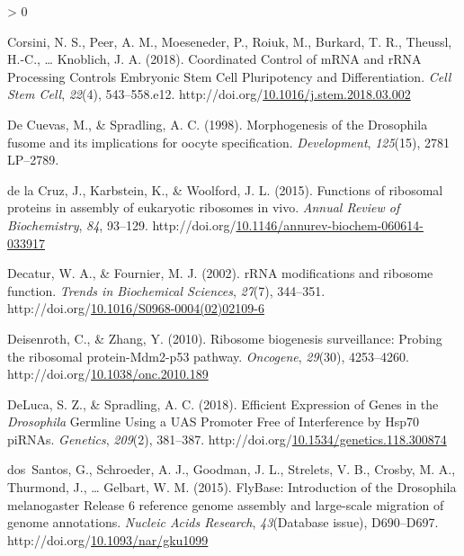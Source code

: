 \documentclass[12pt,oneside]{reedthesis}
\newlength{\cslhangindent}
\newenvironment{CSLReferences}[2] %
 {%
  \setlength{\parindent}{0pt}
  \ifodd #1 \everypar{\setlength{\hangindent}{\cslhangindent}}\ignorespaces\fi
  \ifnum #2 > 0
  \setlength{\parskip}{#2\baselineskip}
  \fi
 }%
 {}
\begin{document}
\begin{CSLReferences}{1}{0}
\leavevmode\hypertarget{ref-corsiniCoordinatedControlMRNA2018}{}%
Corsini, N. S., Peer, A. M., Moeseneder, P., Roiuk, M., Burkard, T. R., Theussl, H.-C., \ldots{} Knoblich, J. A. (2018). Coordinated {Control} of {mRNA} and {rRNA Processing Controls Embryonic Stem Cell Pluripotency} and {Differentiation}. \emph{Cell Stem Cell}, \emph{22}(4), 543--558.e12. http://doi.org/\href{https://doi.org/10.1016/j.stem.2018.03.002}{10.1016/j.stem.2018.03.002}

\leavevmode\hypertarget{ref-DeCuevas1998f}{}%
De Cuevas, M., \& Spradling, A. C. (1998). Morphogenesis of the {Drosophila} fusome and its implications for oocyte specification. \emph{Development}, \emph{125}(15), 2781 LP--2789.

\leavevmode\hypertarget{ref-delacruzFunctionsRibosomalProteins2015}{}%
de la Cruz, J., Karbstein, K., \& Woolford, J. L. (2015). Functions of ribosomal proteins in assembly of eukaryotic ribosomes in vivo. \emph{Annual Review of Biochemistry}, \emph{84}, 93--129. http://doi.org/\href{https://doi.org/10.1146/annurev-biochem-060614-033917}{10.1146/annurev-biochem-060614-033917}

\leavevmode\hypertarget{ref-Decatur2002b}{}%
Decatur, W. A., \& Fournier, M. J. (2002). {rRNA} modifications and ribosome function. \emph{Trends in Biochemical Sciences}, \emph{27}(7), 344--351. http://doi.org/\href{https://doi.org/10.1016/S0968-0004(02)02109-6}{10.1016/S0968-0004(02)02109-6}

\leavevmode\hypertarget{ref-Deisenroth2010e}{}%
Deisenroth, C., \& Zhang, Y. (2010). Ribosome biogenesis surveillance: {Probing} the ribosomal protein-{Mdm2-p53} pathway. \emph{Oncogene}, \emph{29}(30), 4253--4260. http://doi.org/\href{https://doi.org/10.1038/onc.2010.189}{10.1038/onc.2010.189}

\leavevmode\hypertarget{ref-delucaEfficientExpressionGenes2018}{}%
DeLuca, S. Z., \& Spradling, A. C. (2018). Efficient {Expression} of {Genes} in the {\emph{Drosophila}} {Germline Using} a {UAS Promoter Free} of {Interference} by {Hsp70 piRNAs}. \emph{Genetics}, \emph{209}(2), 381--387. http://doi.org/\href{https://doi.org/10.1534/genetics.118.300874}{10.1534/genetics.118.300874}

\leavevmode\hypertarget{ref-dossantosFlyBaseIntroductionDrosophila2015}{}%
dos~Santos, G., Schroeder, A. J., Goodman, J. L., Strelets, V. B., Crosby, M. A., Thurmond, J., \ldots{} Gelbart, W. M. (2015). {FlyBase}: Introduction of the {Drosophila} melanogaster {Release} 6 reference genome assembly and large-scale migration of genome annotations. \emph{Nucleic Acids Research}, \emph{43}(Database issue), D690--D697. http://doi.org/\href{https://doi.org/10.1093/nar/gku1099}{10.1093/nar/gku1099}


\end{CSLReferences}
\end{document}
